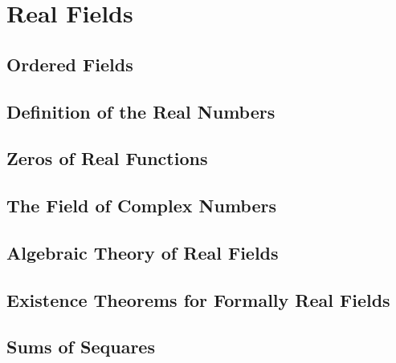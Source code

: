 \section{Real Fields}

\subsection{Ordered Fields}

\subsection{Definition of the Real Numbers}

\subsection{Zeros of Real Functions}

\subsection{The Field of Complex Numbers}

\subsection{Algebraic Theory of Real Fields}

\subsection{Existence Theorems for Formally Real Fields}

\subsection{Sums of Sequares}